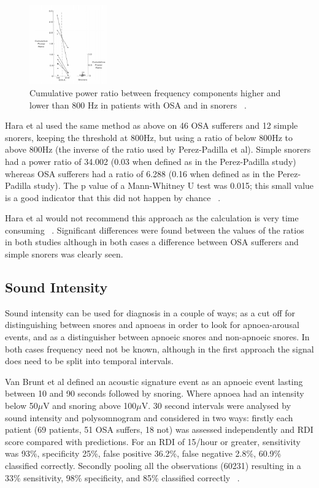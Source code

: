 \begin{figure}[h]
\centering 
\includegraphics[width=0.3\textwidth]{drawings/Perez1993fig8}
\caption{Cumulative power ratio between frequency components higher and lower than 800 Hz in patients with OSA and in snorers ~\cite{whitelaw1993characteristics}.}
\label{fig:Perez1993fig8}
\end{figure}

Hara et al used the same method as above on 46 OSA sufferers and 12 simple snorers, keeping the threshold at 800Hz, but using a ratio of below 800Hz to above 800Hz (the inverse of the ratio used by Perez-Padilla et al). Simple snorers had a power ratio of 34.002 (0.03 when defined as in the Perez-Padilla study) whereas OSA sufferers had a ratio of 6.288 (0.16 when defined as in the Perez-Padilla study). The p value of a Mann-Whitney U test was 0.015; this small value is a good indicator that this did not happen by chance ~\cite{hara2006acoustic}. 

Hara et al would not recommend this approach as the calculation is very time consuming ~\cite{hara2006acoustic}. Significant differences were found between the values of the ratios in both studies although in both cases a difference between OSA sufferers and simple snorers was clearly seen. 
\subsection{Sound Intensity}
Sound intensity can be used for diagnosis in a couple of ways; as a cut off for distinguishing between snores and apnoeas in order to look for apnoea-arousal events, and as a distinguisher between apnoeic snores and non-apnoeic snores. In both cases frequency need not be known, although in the first approach the signal does need to be split into temporal intervals. 

Van Brunt et al defined an acoustic signature event as an apnoeic event lasting between 10 and 90 seconds followed by snoring. Where apnoea had an intensity below 50$\mu$V and snoring above 100$\mu$V. 30 second intervals were analysed by sound intensity and polysomnogram and considered in two ways: firstly each patient (69 patients, 51 OSA suffers, 18 not) was assessed independently and RDI score compared with predictions. For an RDI of 15/hour or greater, sensitivity was 93\%, specificity 25\%, false positive 36.2\%, false negative 2.8\%, 60.9\% classified correctly. Secondly pooling all the observations (60231) resulting in a 33\% sensitivity, 98\% specificity, and 85\% classified correctly ~\cite{van1997intensity}.


